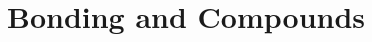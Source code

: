 \documentclass[../hchem.tex]{subfiles}
\begin{document}
\chapter{Bonding and Compounds}
\end{document}
